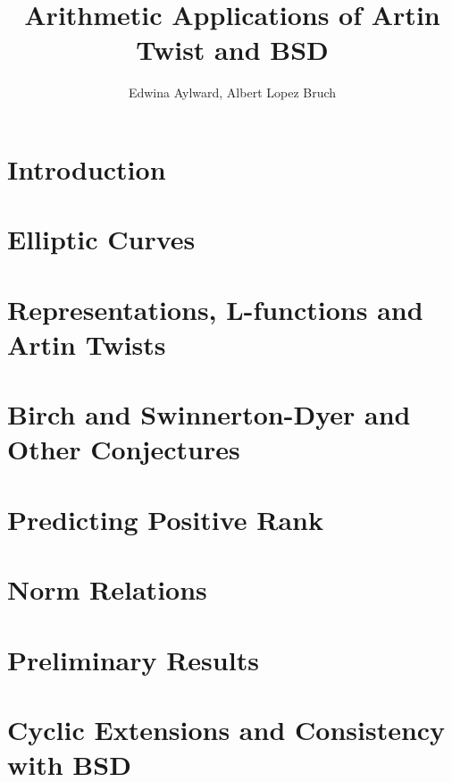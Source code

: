 \documentclass{article}
\title{Arithmetic Applications of Artin Twist and BSD}
\author{Edwina Aylward, Albert Lopez Bruch}
\theoremstyle{plain}
\theoremstyle{definition}
\begin{document}
\maketitle
{}
\tableofcontents
\newpage

\section{Introduction}


\newpage
\section{Elliptic Curves}\label{sec_EC}


\newpage
\section{Representations, L-functions and Artin Twists}\label{sec_Lside}


\newpage
\section{Birch and Swinnerton-Dyer and Other Conjectures}\label{sec_BSD}


\newpage
\section{Predicting Positive Rank}\label{sec_pos_rank}


\newpage
\section{Norm Relations}\label{sec_norm}





\newpage
\section{Preliminary Results}\label{sec_preliminary}


\newpage
\section{Cyclic Extensions and Consistency with BSD}\label{sec_cyclic}

\end{document}

